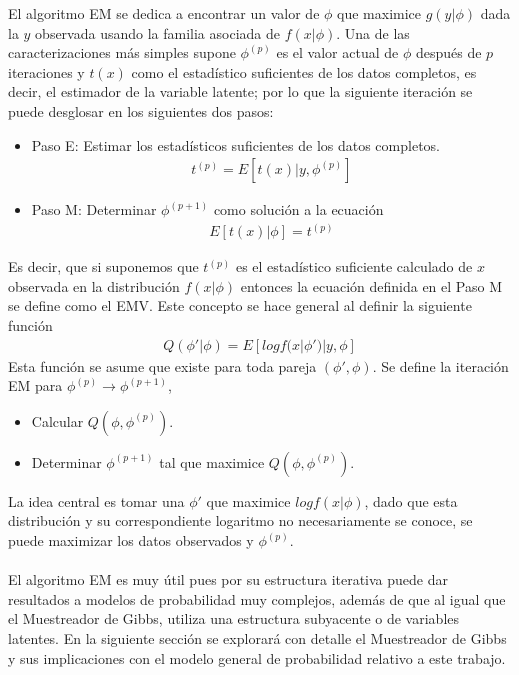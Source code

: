 El algoritmo EM se dedica a encontrar un valor de $\phi$ que maximice $g(y|\phi)$ dada la $y$ observada usando la familia asociada de $f(x|\phi)$. Una de las caracterizaciones m\'as simples supone $\phi^{(p)}$ es el valor actual de $\phi$ despu\'es de $p$ iteraciones y $t(x)$ como el estad\'istico suficientes de los datos completos, es decir, el estimador de la variable latente; por lo que la siguiente iteraci\'on se puede desglosar en los siguientes dos pasos:
\begin{itemize}
\item Paso E: Estimar los estad\'isticos suficientes de los datos completos.
	\begin{align*}
	t^{(p)}=E[t(x)|y,\phi^{(p)}]
	\end{align*}
\item Paso M: Determinar $\phi^{(p+1)}$ como soluci\'on a la ecuaci\'on
	\begin{align*}
	E[t(x)|\phi]=t^{(p)}
	\end{align*}
\end{itemize}
Es decir, que si suponemos que $t^{(p)}$ es el estad\'istico suficiente calculado de $x$ observada en la distribuci\'on $f(x|\phi)$ entonces la ecuaci\'on definida en el Paso M se define como el EMV. Este concepto se hace general al definir la siguiente funci\'on
\begin{align*}
Q(\phi'|\phi)=E[log f(x|\phi')|y,\phi]
\end{align*}
Esta funci\'on se asume que existe para toda pareja $(\phi',\phi)$. Se define la iteraci\'on EM para $\phi^{(p)} \to \phi^{(p+1)}$,
\begin{itemize}
\item Calcular $Q(\phi,\phi^{(p)})$.
\item Determinar $\phi^{(p+1)}$ tal que maximice $Q(\phi,\phi^{(p)})$.
\end{itemize}
La idea central es tomar una $\phi'$ que maximice $log f(x|\phi)$, dado que esta distribuci\'on y su correspondiente logaritmo no necesariamente se conoce, se puede maximizar los datos observados y $\phi^{(p)}$.\\
\\
El algoritmo EM es muy \'util pues por su estructura iterativa puede dar resultados a modelos de probabilidad muy complejos, adem\'as de que al igual que el Muestreador de Gibbs, utiliza una estructura subyacente o de variables latentes. En la siguiente secci\'on se explorar\'a con detalle el Muestreador de Gibbs y sus implicaciones con el modelo general de probabilidad relativo a este trabajo.
